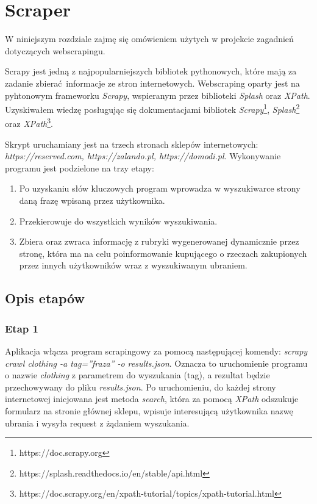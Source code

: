 \chapter {Scraper} 

W niniejszym rozdziale zajmę się omówieniem użytych w projekcie zagadnień dotyczących webscrapingu.

Scrapy jest jedną z najpopularniejszych bibliotek pythonowych, które mają za zadanie zbierać informacje ze stron internetowych.
Webscraping oparty jest na pyhtonowym frameworku \emph{Scrapy}, wspieranym przez biblioteki \emph{Splash} oraz \emph{XPath}.
Uzyskiwałem wiedzę posługując się dokumentacjami bibliotek \emph{Scrapy}\footnote{https://doc.scrapy.org}, \emph{Splash}\footnote{https://splash.readthedocs.io/en/stable/api.html} oraz \emph{XPath}\footnote{https://doc.scrapy.org/en/xpath-tutorial/topics/xpath-tutorial.html}.

Skrypt uruchamiany jest na trzech stronach sklepów internetowych: \emph{https://reserved.com, https://zalando.pl, https://domodi.pl}. 
Wykonywanie programu jest podzielone na trzy etapy:
\begin{enumerate}
	\item Po uzyskaniu słów kluczowych program wprowadza w wyszukiwarce strony daną frazę wpisaną przez użytkownika.
	\item Przekierowuje do wszystkich wyników wyszukiwania.
	\item Zbiera oraz zwraca informację z rubryki wygenerowanej dynamicznie przez stronę, która	ma na celu poinformowanie kupującego o rzeczach zakupionych przez innych użytkowników wraz z wyszukiwanym ubraniem.
\end{enumerate}
\section{Opis etapów}

\subsection{Etap 1}
	Aplikacja włącza program scrapingowy za pomocą następującej komendy: \emph{scrapy crawl clothing -a tag=”fraza” -o results.json}.
Oznacza to uruchomienie programu o nazwie \emph{clothing} z parametrem do wyszukania (tag), a rezultat będzie przechowywany do pliku \emph{results.json}.
Po uruchomieniu, do każdej strony internetowej inicjowana jest metoda \emph{search}, która za pomocą \emph{XPath} odszukuje formularz na stronie głównej sklepu, wpisuje interesującą użytkownika nazwę ubrania i wysyła request z żądaniem wyszukania.

